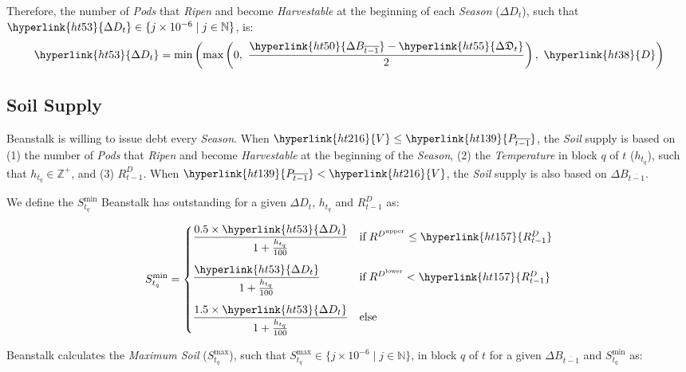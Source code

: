 \documentclass[tikz]{article}
\newcommand{\term}[1]{\textsl{#1}}
\begin{document}
Therefore, the number of \term{Pods} that \term{Ripen} and become \term{Harvestable} at the beginning of each \term{Season} (\hyperlink{ht53}{$\Delta D_t$}), such that $\hyperlink{ht53}{\Delta D_t} \in \{j \times 10^{-6} \mid j \in \mathbb{N} \}$, is:
\vspace*{1mm}
$$\hyperlink{ht53}{\Delta D_t} = \text{min}\left(\text{max}\left(0,\ \frac{\hyperlink{ht50}{\Delta B_{\overline{t-1}}} - \hyperlink{ht55}{\Delta \mathfrak{D}_t}}{2}\right),\ \hyperlink{ht38}{D}\right)$$

\subsection{Soil Supply}
\vspace*{1mm}
Beanstalk is willing to issue debt every \term{Season}. When $\hyperlink{ht216}{V} \leq \hyperlink{ht139}{P_{\overline{t-1}}}$, the \term{Soil} supply is based on (1) the number of \term{Pods} that \term{Ripen} and become \term{Harvestable} at the beginning of the \term{Season}, (2) the \term{Temperature} in block $q$ of $t$ ($h_{t_q}$), such that $h_{t_q} \in \mathbb{Z}^{+}$, and (3) \hyperlink{ht157}{$R^D_{t-1}$}. When $\hyperlink{ht139}{P_{\overline{t-1}}} < \hyperlink{ht216}{V}$, the \term{Soil} supply is also based on \hyperlink{ht50}{$\Delta B_{\overline{t-1}}$}.

We define the $S_{t_q}^{\text{min}}$ Beanstalk has outstanding for a given \hyperlink{ht53}{$\Delta D_t$}, {$h_{t_q}$} and \hyperlink{ht157}{$R^D_{t-1}$} as:
\vspace*{2mm}

$$S_{t_q}^{\text{min}} = \begin{cases} \dfrac{0.5 \times \hyperlink{ht53}{\Delta D_t}}{1 + \frac{h_{t_q}}{100}} & \text{if} \; R^{D^{\text{upper}}} \leq \hyperlink{ht157}{R^D_{t-1}} \vspace{.3cm} \\ 
\dfrac{\hyperlink{ht53}{\Delta D_t}}{1 + \frac{h_{t_q}}{100}} & \text{if} \; R^{D^{\text{lower}}} < \hyperlink{ht157}{R^D_{t-1}} \vspace{.3cm} \\ 
\dfrac{1.5 \times \hyperlink{ht53}{\Delta D_t}}{1 + \frac{h_{t_q}}{100}} & \text{else} \end{cases}$$

\vspace*{2mm}

Beanstalk calculates the \term{Maximum Soil} ($S_{t_q}^{\text{max}}$), such that $S_{t_q}^{\text{max}} \in \{j \times 10^{-6} \mid j \in \mathbb{N} \}$, in block $q$ of $t$ for a given \hyperlink{ht50}{$\Delta B_{\overline{t-1}}$} and $S_{t_q}^{\text{min}}$ as:
\end{document}
